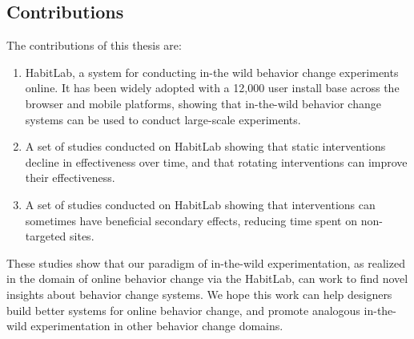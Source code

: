 
\subsection{Contributions}

The contributions of this thesis are:

\begin{enumerate}
\item HabitLab, a system for conducting in-the wild behavior change experiments online. It has been widely adopted with a 12,000 user install base across the browser and mobile platforms, showing that in-the-wild behavior change systems can be used to conduct large-scale experiments.
\item A set of studies conducted on HabitLab showing that static interventions decline in effectiveness over time, and that rotating interventions can improve their effectiveness.
\item A set of studies conducted on HabitLab showing that interventions can sometimes have beneficial secondary effects, reducing time spent on non-targeted sites.
\end{enumerate}



These studies show that our paradigm of in-the-wild experimentation, as realized in the domain of online behavior change via the HabitLab, can work to find novel insights about behavior change systems. We hope this work can help designers build better systems for online behavior change, and promote analogous in-the-wild experimentation in other behavior change domains.



